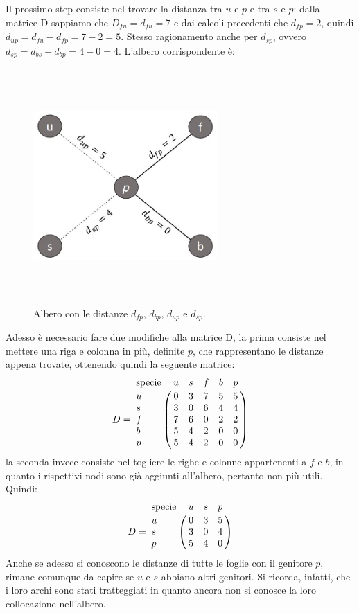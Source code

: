 \newline
Il prossimo step consiste nel trovare la distanza tra $u$ e $p$ e tra $s$ e $p$: dalla matrice D sappiamo che $D_{fu}=d_{fu}=7$ e dai calcoli precedenti che $d_{fp}=2$, quindi $d_{up}=d_{fu}-d_{fp}=7-2=5$. Stesso ragionamento anche per $d_{sp}$, ovvero $d_{sp}=d_{bs}-d_{bp}=4-0=4$.
\newline
L'albero corrispondente è:
\newpage
\begin{figure}[h!]
\centering
	\includegraphics[height=9cm, width=7cm, keepaspectratio]{distance_between_f_b_part_4.jpg}
 	\caption{Albero con le distanze $d_{fp}$, $d_{bp}$, $d_{up}$ e $d_{sp}$.}
  	\label{fig:neighborsleaves_3}
\end{figure}
Adesso è necessario fare due modifiche alla matrice D, la prima consiste nel mettere una riga e colonna in più, definite $p$, che rappresentano le distanze appena trovate, ottenendo quindi la seguente matrice:
\[
D = \bordermatrix{\text{specie}&u&s&f&b&p\cr
                u& 0 & 3 & 7 & 5 & 5\cr
                s& 3 & 0 & 6 & 4 & 4\cr
                f& 7 & 6 & 0 & 2 & 2\cr
                b& 5 & 4 & 2 & 0 & 0\cr
                p&  5 & 4 & 2 & 0 & 0}
\]
la seconda invece consiste nel togliere le righe e colonne appartenenti a $f$ e $b$, in quanto i rispettivi nodi sono già aggiunti all'albero, pertanto non più utili. Quindi:
\[
D = \bordermatrix{\text{specie}&u&s&p\cr
                u& 0 & 3 & 5\cr
                s& 3 & 0 & 4\cr
                p&  5 & 4 & 0}
\]
Anche se adesso si conoscono le distanze di tutte le foglie con il genitore $p$, rimane comunque da capire se $u$ e $s$ abbiano altri genitori. Si ricorda, infatti, che i loro archi sono stati tratteggiati in quanto ancora non si conosce la loro collocazione nell'albero.
